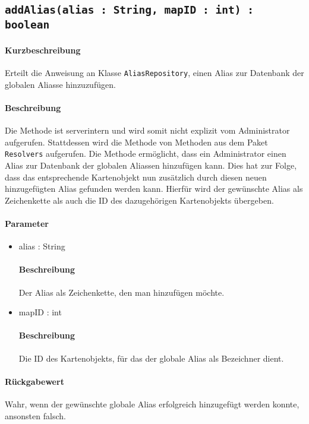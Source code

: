 \subsection{\texttt{addAlias(alias : String, mapID : int) : boolean}}%
\paragraph*{Kurzbeschreibung}
Erteilt die Anweisung an Klasse \texttt{AliasRepository}, einen Alias zur Datenbank der globalen Aliasse hinzuzufügen.
\paragraph*{Beschreibung}
Die Methode ist serverintern und wird somit nicht explizit vom Administrator aufgerufen.
Stattdessen wird die Methode von Methoden aus dem Paket \texttt{Resolvers} aufgerufen.
Die Methode ermöglicht, dass ein Administrator einen Alias zur Datenbank der globalen Aliassen hinzufügen kann.
Dies hat zur Folge, dass das entsprechende Kartenobjekt nun zusätzlich durch diesen neuen hinzugefügten Alias gefunden werden kann.
Hierfür wird der gewünschte Alias als Zeichenkette als auch die ID des dazugehörigen Kartenobjekts übergeben.
\paragraph*{Parameter}
\begin{itemize}
    \item alias : String
    		\paragraph*{Beschreibung}
    		Der Alias als Zeichenkette, den man hinzufügen möchte.
    \item mapID : int
    		\paragraph*{Beschreibung}
    		Die ID des Kartenobjekts, für das der globale Alias als Bezeichner dient.
\end{itemize}
\paragraph*{Rückgabewert}
Wahr, wenn der gewünschte globale Alias erfolgreich hinzugefügt werden konnte, ansonsten falsch.
